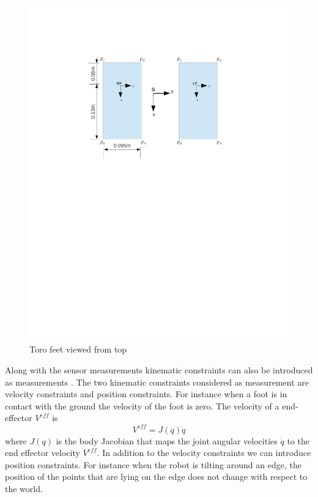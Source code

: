 \begin{figure}
    \begin{center}
    \includegraphics[trim= 20mm 150mm 20mm 50mm,scale=0.80]{Bilder/foot_topview.pdf}
    \caption{Toro feet viewed from top}
    \label{fig:biped_feet}
    \end{center}
\end{figure}
Along with the sensor measurements kinematic constraints can also be introduced as measurements \citep{atk12}. The two kinematic constraints considered as measurement are velocity constraints and position constraints. For instance when a foot is in contact with the ground the velocity of the foot is zero. The velocity of a end-effector $V^{eff}$ is \citep[chapter 3]{mur94} 
\begin{equation}
    V^{eff} = J(q) \dot q
\end{equation}
where $J(q)$ is the body Jacobian that maps the joint angular velocities $\dot q$ to the end effector velocity $V^{eff}$. In addition to the velocity constraints we can introduce position constraints. For instance when the robot is tilting around an edge, the position of the points that are lying on the edge does not change with respect to the world. 
